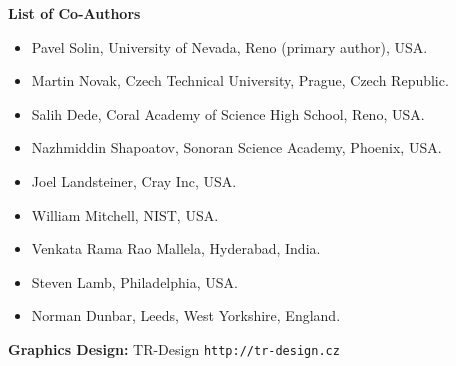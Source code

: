 \documentclass[article,A4,12pt]{llncs}
\begin{document}
\noindent
{\bf List of Co-Authors}
\begin{itemize}
\item Pavel Solin, University of Nevada, Reno (primary author), USA. 
\item Martin Novak, Czech Technical University, Prague, Czech Republic.
\item Salih Dede, Coral Academy of Science High School, Reno, USA.
\item Nazhmiddin Shapoatov, Sonoran Science Academy, Phoenix, USA.
\item Joel Landsteiner, Cray Inc, USA.
\item William Mitchell, NIST, USA.
\item Venkata Rama Rao Mallela, Hyderabad, India.
\item Steven Lamb, Philadelphia, USA.
\item Norman Dunbar, Leeds, West Yorkshire, England.
\end{itemize}
\vspace{4mm}
{\bf Graphics Design:} TR-Design {\tt http://tr-design.cz}

%
%
%



\newpage
\setcounter{tocdepth}{2}
\tableofcontents

\newpage
\end{document}
